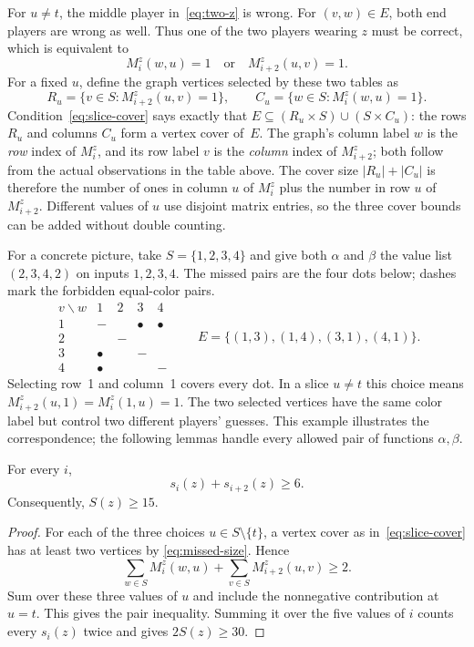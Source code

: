 For $u\ne t$, the middle player in~\eqref{eq:two-z} is wrong. For
$(v,w)\in E$, both end players are wrong as well. Thus one of the two
players wearing $z$ must be correct, which is equivalent to
\begin{equation}\label{eq:slice-cover}
M_i^z(w,u)=1\quad\text{or}\quad M_{i+2}^z(u,v)=1.
\end{equation}
For a fixed $u$, define the graph vertices selected by these two tables as
\[
R_u=\{v\in S:M_{i+2}^z(u,v)=1\},\qquad
C_u=\{w\in S:M_i^z(w,u)=1\}.
\]
Condition~\eqref{eq:slice-cover} says exactly that
$E\subseteq(R_u\times S)\cup(S\times C_u)$: the rows $R_u$ and columns
$C_u$ form a vertex cover of~$E$.
The graph's column label $w$ is the \emph{row} index of $M_i^z$, and its
row label $v$ is the \emph{column} index of $M_{i+2}^z$; both follow from
the actual observations in the table above. The cover size $|R_u|+|C_u|$
is therefore the number of ones in column $u$ of $M_i^z$ plus the number
in row $u$ of $M_{i+2}^z$. Different values of $u$ use disjoint matrix
entries, so the three cover bounds can be added without double counting.

For a concrete picture, take $S=\{1,2,3,4\}$ and give both $\alpha$ and
$\beta$ the value list $(2,3,4,2)$ on inputs $1,2,3,4$. The missed pairs
are the four dots below; dashes mark the forbidden equal-color pairs.
\[
\begin{array}{c|cccc}
v\backslash w&1&2&3&4\\\hline
1&-& &\bullet&\bullet\\
2& &-& & \\
3&\bullet& &-& \\
4&\bullet& & &-
\end{array}
\qquad
E=\{(1,3),(1,4),(3,1),(4,1)\}.
\]
Selecting row~1 and column~1 covers every dot. In a slice $u\ne t$ this
choice means $M_{i+2}^z(u,1)=M_i^z(1,u)=1$. The two selected vertices
have the same color label but control two different players' guesses.
This example illustrates the correspondence; the following lemmas handle
every allowed pair of functions $\alpha,\beta$.

\begin{lemma}\label{lem:pair}
For every $i$,
\[
s_i(z)+s_{i+2}(z)\geq6.
\]
Consequently, $S(z)\geq15$.
\end{lemma}
\begin{proof}
For each of the three choices $u\in S\setminus\{t\}$, a vertex cover as
in~\eqref{eq:slice-cover} has at least two vertices by
\eqref{eq:missed-size}. Hence
\[
\sum_{w\in S}M_i^z(w,u)+\sum_{v\in S}M_{i+2}^z(u,v)\geq2.
\]
Sum over these three values of $u$ and include the nonnegative contribution
at $u=t$. This gives the pair inequality. Summing it over the five values
of $i$ counts every $s_i(z)$ twice and gives $2S(z)\geq30$.
\end{proof}

